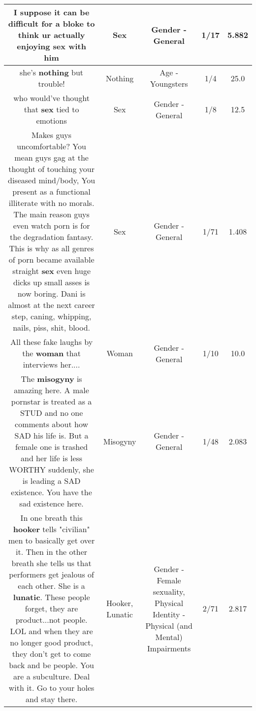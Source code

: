 \documentclass[11pt]{article}
\newlength\mylength
\begin{document}
\begin{center}
\begin{longtable}{|C{.65\mylength}|C{.30\mylength}|C{.12\mylength}|C{.12\mylength}|C{.12\mylength}|}
  \small I suppose it can be difficult for a bloke to think ur actually enjoying \textbf{sex} with him\normalsize   & Sex & Gender - General & 1/17 & 5.882 \\  \hline
  \small she's \textbf{nothing} but trouble!\normalsize   & Nothing & Age - Youngsters & 1/4 & 25.0 \\  \hline
  \small who would've thought that \textbf{sex} tied to emotions\normalsize   & Sex & Gender - General & 1/8 & 12.5 \\  \hline
  \small Makes guys uncomfortable?  You mean guys gag at the thought of touching your diseased mind/body,  You present as a functional illiterate with no  morals.   The main reason guys even watch porn is for the degradation fantasy.  This is why as all genres of porn became available straight \textbf{sex} even huge dicks up small asses is now boring.  Dani is almost at the next career step, caning, whipping, nails, piss, shit, blood.\normalsize   & Sex & Gender - General & 1/71 & 1.408 \\  \hline
  \small All these fake laughs by the \textbf{woman} that interviews her....\normalsize   & Woman & Gender - General & 1/10 & 10.0 \\  \hline
  \small The \textbf{misogyny} is amazing here. A male pornstar is treated as a STUD and no one comments about how SAD his life is. But a female one is trashed and her life is less WORTHY suddenly, she is leading a SAD existence. You have the sad existence here.\normalsize   & Misogyny & Gender - General & 1/48 & 2.083 \\  \hline
  \small In one breath this \textbf{hooker} tells "civilian" men to basically get over it.  Then in the other breath she tells us that performers get jealous of each other.  She is a \textbf{lunatic}.  These people forget, they are product...not people.  LOL and when they are no longer good product, they don't get to come back and be people.  You are a subculture.  Deal with it.  Go to your holes and stay there.\normalsize   & Hooker, Lunatic & Gender - Female sexuality, Physical Identity - Physical (and Mental) Impairments & 2/71 & 2.817 \\  \hline

\end{longtable}
\end{center}
\end{document}
